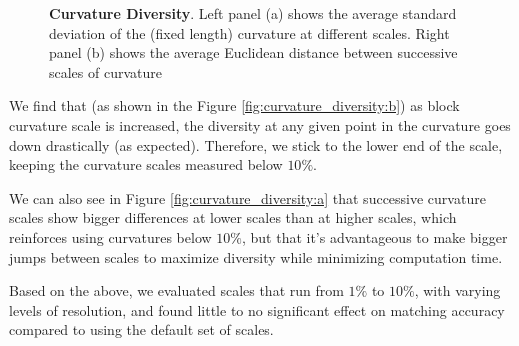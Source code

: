 \begin{figure}[t]%
\centering
{}
%
\caption{\textbf{Curvature Diversity}. Left panel (a) shows the average standard deviation of the (fixed length) curvature at different scales. Right panel (b) shows the average Euclidean distance between successive scales of curvature}
\label{fig:curvature_diversity}
\end{figure}

We find that (as shown in the Figure \ref{fig:curvature_diversity:b}) as block curvature scale is increased, the diversity at any given point in the curvature goes down drastically (as expected). 
Therefore, we stick to the lower end of the scale, keeping the curvature scales measured below $10\%$.

We can also see in Figure \ref{fig:curvature_diversity:a} that successive curvature scales show bigger differences at lower scales than at higher scales, which reinforces using curvatures below $10\%$, but that it's advantageous to make bigger jumps between scales to maximize diversity while minimizing computation time.

Based on the above, we evaluated scales that run from $1\%$ to $10\%$, with varying levels of resolution, and found little to no significant effect on matching accuracy compared to using the default set of scales.


